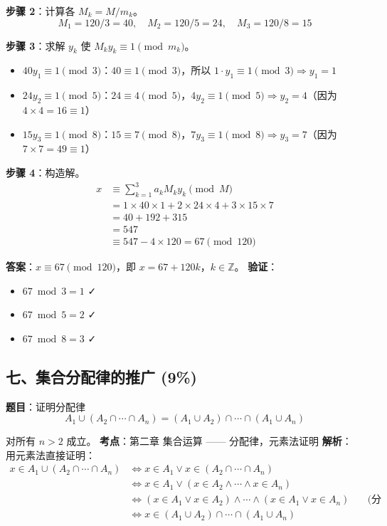 \documentclass[10pt,a4paper,openany]{ctexbook}
\theoremstyle{definition}
\theoremstyle{remark}
\begin{document}
\textbf{步骤 2}：计算各 $M_k = M / m_k$。
\[
M_1 = 120 / 3 = 40,\quad M_2 = 120 / 5 = 24,\quad M_3 = 120 / 8 = 15
\]

\textbf{步骤 3}：求解 $y_k$ 使 $M_k y_k \equiv 1 \pmod{m_k}$。
\begin{itemize}
\item $40 y_1 \equiv 1 \pmod{3}$：$40 \equiv 1 \pmod{3}$，所以 $1 \cdot y_1 \equiv 1 \pmod{3} \Rightarrow y_1 = 1$
\item $24 y_2 \equiv 1 \pmod{5}$：$24 \equiv 4 \pmod{5}$，$4 y_2 \equiv 1 \pmod{5} \Rightarrow y_2 = 4$（因为 $4 \times 4 = 16 \equiv 1$）
\item $15 y_3 \equiv 1 \pmod{8}$：$15 \equiv 7 \pmod{8}$，$7 y_3 \equiv 1 \pmod{8} \Rightarrow y_3 = 7$（因为 $7 \times 7 = 49 \equiv 1$）

\end{itemize}

\textbf{步骤 4}：构造解。
\[
\begin{aligned}
x &\equiv \sum_{k=1}^{3} a_k M_k y_k \pmod{M} \\
&= 1 \times 40 \times 1 + 2 \times 24 \times 4 + 3 \times 15 \times 7 \\
&= 40 + 192 + 315 \\
&= 547 \\
&\equiv 547 - 4 \times 120 = 67 \pmod{120}
\end{aligned}
\]

\textbf{答案}：$x \equiv 67 \pmod{120}$，即 $x = 67 + 120k$，$k \in \mathbb{Z}$。
\textbf{验证}：
\begin{itemize}
\item $67 \bmod 3 = 1$ ✓
\item $67 \bmod 5 = 2$ ✓
\item $67 \bmod 8 = 3$ ✓

\end{itemize}

\vspace{-2pt}

\subsection{七、集合分配律的推广 (9\%)}

\textbf{题目}：证明分配律
\[
A_1 \cup (A_2 \cap \cdots \cap A_n) = (A_1 \cup A_2) \cap \cdots \cap (A_1 \cup A_n)
\]

对所有 $n > 2$ 成立。
\textbf{考点}：第二章 集合运算 —— 分配律，元素法证明
\textbf{解析}：
用元素法直接证明：
\[
\begin{aligned}
x \in A_1 \cup (A_2 \cap \cdots \cap A_n)
&\iff x \in A_1 \lor x \in (A_2 \cap \cdots \cap A_n) \\
&\iff x \in A_1 \lor (x \in A_2 \land \cdots \land x \in A_n) \\
&\iff (x \in A_1 \lor x \in A_2) \land \cdots \land (x \in A_1 \lor x \in A_n) \quad &\text{(分配律)}\\
&\iff x \in (A_1 \cup A_2) \cap \cdots \cap (A_1 \cup A_n)
\end{aligned}
\]
\end{document}
